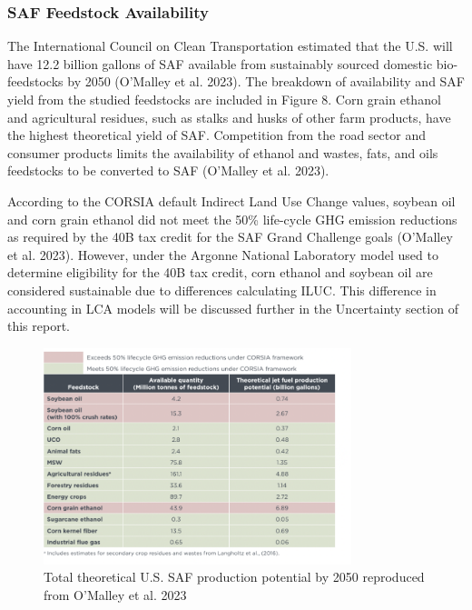 \documentclass[12pt]{article}
\begin{document}
\subsubsection{SAF Feedstock Availability}

The International Council on Clean Transportation estimated that the U.S. will have 12.2 billion gallons of SAF available from sustainably sourced domestic bio-feedstocks by 2050 (O’Malley et al. 2023). The breakdown of availability and SAF yield from the studied feedstocks are included in Figure 8. Corn grain ethanol and agricultural residues, such as stalks and husks of other farm products, have the highest theoretical yield of SAF. Competition from the road sector and consumer products limits the availability of ethanol and wastes, fats, and oils feedstocks to be converted to SAF (O’Malley et al. 2023). 

According to the CORSIA default Indirect Land Use Change values, soybean oil and corn grain ethanol did not meet the 50\% life-cycle GHG emission reductions as required by the 40B tax credit for the SAF Grand Challenge goals (O’Malley et al. 2023). However, under the Argonne National Laboratory model used to determine eligibility for the 40B tax credit, corn ethanol and soybean oil are considered sustainable due to differences calculating ILUC. This difference in accounting in LCA models will be discussed further in the Uncertainty section of this report.


\begin{figure}[H]
\centering
\includegraphics[width=0.8\textwidth]{Figures/Figure 10.png} %
\caption{Total theoretical U.S. SAF production potential by 2050 reproduced from O’Malley et al. 2023}
\label{fig:figure10}
\end{figure}
\end{document}

